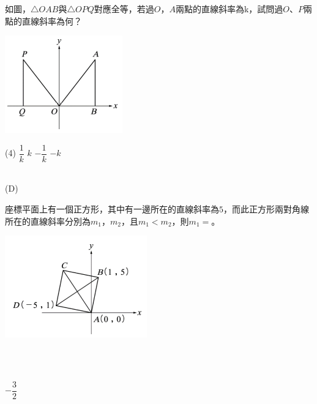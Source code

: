 \documentclass
[answers]
{exam}
\newcommand\ul[1]{\uline{\hspace*{#1}}}
\theoremstyle{definition}
\begin{document}
\begin{questions}
\question

\begin{minipage}[t]{0.7\linewidth}
	如圖，$\triangle OAB$與$\triangle OPQ$對應全等，若過$O$，$A$兩點的直線斜率為k，試問過$O$、$P$兩點的直線斜率為何？
\end{minipage}
\hfill
\begin{minipage}[t]{0.3\linewidth}
	\vspace*{-0.3cm}
	\includegraphics[scale=1]{./chapter_3/figure/8.png}
	\raggedleft %
\end{minipage}

\begin{tasks}(4)
	\task $\dfrac{1}{k}$
	\task $k$
	\task $-\dfrac{1}{k}$
	\task $-k$
\end{tasks}
\begin{solution}~\\
	(D)
\end{solution}

\question

\begin{minipage}[t]{0.7\linewidth}
	座標平面上有一個正方形，其中有一邊所在的直線斜率為$5$，而此正方形兩對角線所在的直線斜率分別為$m_1$，$m_2$，且$m_1 < m_2$，則$m_1=$\ul{50pt}。
\end{minipage}
\hfill
\begin{minipage}[t]{0.3\linewidth}
	\vspace*{-0.3cm}
	\includegraphics[scale=1]{./chapter_3/figure/9.png}
	\raggedleft %
\end{minipage}
\\ 
\begin{solution}~\\
	$-\dfrac{3}{2}$
\end{solution}


\end{questions}
\end{document}
